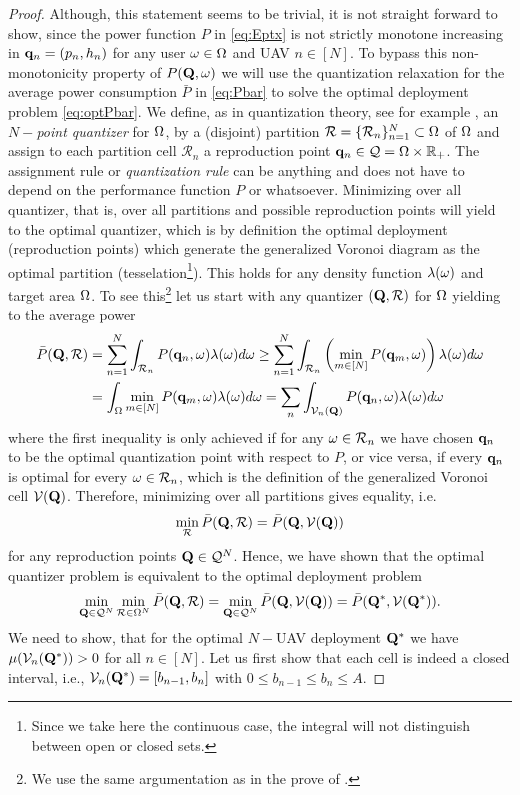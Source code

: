 \documentclass[smallabstract,smallcaptions]{dccpaper}
\newcounter{example}[section]
\newcommand{\Pbar}{\ensuremath{\bar{P}}}         %
\newcommand{\Vor}{\ensuremath{\mathcal{V}}}         %
\newcommand{\Rset}{\ensuremath{\mathcal R}}
\newcommand{\Qset}{\ensuremath{\mathcal Q}}
\begin{document}
\begin{proof}
  Although, this statement seems to be trivial, it is not straight forward to show, since the power function $P$ in
  \eqref{eq:Eptx} is not strictly monotone increasing in ${\mathbf q}_n=(p_n,h_n)$ for any user $\omega \in\Omega$ and UAV
  $n\in[N]$. To bypass this non-monotonicity property of $P(\mathbf Q,\omega)$ we will use the quantization relaxation for the
  average power consumption $\Pbar$ in \eqref{eq:Pbar} to  solve the optimal deployment problem \eqref{eq:optPbar}. We
  define, as in quantization theory, see for example \cite{GN98}, an \emph{$N-$point quantizer} for $\Omega$, by a
  (disjoint) partition $\Rset=\{\Rset_n\}_{n=1}^N\subset \Ome$ of $\Omega$ and assign to each partition cell $\Rset_n$ a
  reproduction point $\vq_n\in\Qset=\Ome\times\R_+$. The assignment rule or \emph{quantization rule} can be anything and
  does not have to depend on the performance function $P$ or whatsoever.  Minimizing over all quantizer, that is, over
  all partitions and possible reproduction points will yield to the optimal quantizer, which is by definition the
  optimal deployment (reproduction points) which generate the generalized Voronoi diagram as the optimal partition
  (tesselation\footnote{Since we take here the continuous case, the integral will not distinguish between open or closed
  sets.}). This holds for any density function $\lambda(\omega)$ and target area $\Omega$.  To see this\footnote{We use the
    same argumentation as in the prove of \cite[Prop.1]{Erdem}.} let us start with any quantizer $(\vQ,\Rset)$ for $\Omega$
    yielding to the average power 
  \begin{align}
    \Pbar(\vQ,\Rset) &=\sum_{n=1}^N \int_{\Rset_n} P(\vq_n,\ome)\lam(\ome) d\ome \geq \sum_{n=1}^N \int_{\Rset_n} 
    \left(\min_{m\in[N]} P(\vq_m,\ome) \right) \lam(\ome)d\ome\\
    &=\int_{\Ome} \min_{m\in[N]} P(\vq_m,\ome) \lam(\ome)d\ome
    =\sum_n \int_{\Vor_n(\vQ)} P(\vq_n,\ome) \lam(\ome)d\ome\notag
  \end{align} 
  where the first inequality is only achieved if for any $\ome\in \Rset_n$ we have chosen ${\mathbf q}_n$ to be the optimal
  quantization point with respect to $P$, or vice versa, if every ${\mathbf q}_n$ is optimal for every $\ome\in \Rset_n$, which is the
  definition of the generalized Voronoi cell $\Vor(\vQ)$. Therefore, minimizing over all partitions gives equality, i.e.
  \begin{align}
    \min_{\Rset} \Pbar(\vQ,\Rset)=\Pbar(\vQ,\Vor(\vQ))
  \end{align}
  for any reproduction points $\vQ\in\Qset^N$.
  Hence, we have shown that the optimal quantizer problem is equivalent to the optimal deployment problem
  \begin{align}
    \min_{\vQ\in\Qset^N} \min_{\Rset\in\Ome^N} \Pbar(\vQ,\Rset) = \min_{\vQ\in\Qset^N}
    \Pbar(\vQ,\Vor(\vQ))=\Pbar(\vQ^*,\Vor(\vQ^*)).\label{eq:optquanteqoptdeploy}
  \end{align}
  We need to show, that for the optimal $N-$UAV deployment $\mathbf Q^*$ we have $\mu(\Vor_n(\vQ^*))>0$ for all $n\in[N]$.
  Let us first show that each cell is indeed a closed interval, i.e., $\Vor_n(\vQ^*)=[b_{n-1},b_n]$ with $0\leq b_{n-1}\leq
  b_n\leq A$. 
  

\end{proof}
\end{document}
